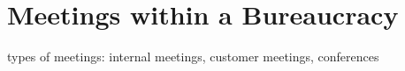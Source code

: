 \documentclass{book}
\begin{document}













\section{Meetings within a Bureaucracy}
types of meetings: internal meetings, customer meetings, conferences 








\clearpage

\printglossaries

\nocite{*} %


\end{document}
